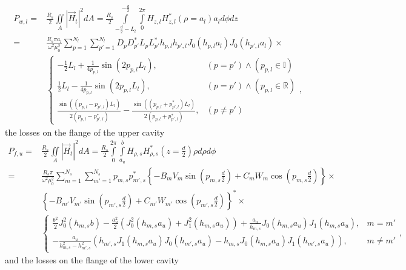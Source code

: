 \begin{align}
P_{w,l}=&\frac{R_s}{2}\iint\limits_\mathit{A}|\vec{H}_t|^2\mathit{dA}=\frac{R_s}{2}\int\limits_{-\frac{d}{2}-L_l}^{-\frac{d}{2}}\int\limits_0^{2\pi}H_{z,l}H_{z,l}^*(\rho=a_l)a_l\mathit{d\phi dz}\\
       =& \frac{R_s\pi a_l}{\omega^2\mu_0^2}\sum\limits_{p=1}^{N_l}\sum\limits_{p'=1}^{N_l}D_pD_{p'}^*L_pL_{p'}^*h_{p,l}h_{p',l}J_0(h_{p,l}a_l)J_0(h_{p',l}a_l)\times\nonumber\\&
       \begin{cases}
        	-\frac{1}{2}L_l+\frac{1}{4p_{p,l}}\sin(2p_{p,l}L_l), &(p=p') \wedge (p_{p,l}\in\mathbb{I})\\
        	 \frac{1}{2}L_l-\frac{1}{4p_{p,l}}\sin(2p_{p,l}L_l), &(p=p')  \wedge  (p_{p,l}\in\mathbb{R})\\
        	 \frac{\sin\left(\left(p_{p,l}-p_{p',l}\right)L_l\right)}{2\left(p_{p,l}-p_{p',l}^*\right)}-\frac{\sin\left(\left(p_{p,l}+p_{p',l}^*\right)L_l\right)}{2\left(p_{p,l}+p_{p',l}^*\right)}, &(p\neq p')
       \end{cases}\text{,}\label{eq:p_wl}
\end{align}
the losses on the flange of the upper cavity
\begin{align}
P_{f,u}=&\frac{R_s}{2}\iint\limits_\mathit{A}|\vec{H}_t|^2\mathit{dA}=\frac{R_s}{2}\int\limits_0^{2\pi}\int\limits_{a_u}^b H_{\rho,s}H_{\rho,s}^*\left(z=\frac{d}{2}\right)\rho \mathit{d\rho d\phi}\\
=& \frac{R_s\pi}{\omega^2\mu_0^2}\sum\limits_{m=1}^{N_s}\sum\limits_{m'=1}^{N_s}p_{m,s}p_{m',s}^* 
 \left\lbrace -B_mV_m\sin(p_{m,s}\frac{d}{2})+C_mW_m\cos(p_{m,s}\frac{d}{2})\right\rbrace\times\nonumber\\
 &\left\lbrace -B_{m'}V_{m'}\sin(p_{m',s}\frac{d}{2})+C_{m'}W_{m'}\cos(p_{m',s}\frac{d}{2})\right\rbrace^*\times\\\label{eq:p_fu}
 &\begin{cases}
 \frac{b^2}{2}J_0^2(h_{m,s}b)-\frac{a_u^2}{2}(J_0^2(h_{m,s}a_u)+J_1^2(h_{m,s}a_u))+\frac{a_u}{h_{m,s}}J_0(h_{m,s}a_u)J_1(h_{m,s}a_u),& m=m'\\
 -\frac{a_u}{h_{m,s}^2-h_{m',s}^2}(h_{m',s}J_1(h_{m,s}a_u)J_0(h_{m',s}a_u)-h_{m,s}J_0(h_{m,s}a_u)J_1(h_{m',s}a_u)),& m\neq m'
 \end{cases}\text{,}\nonumber
\end{align}
and the losses on the flange of the lower cavity
